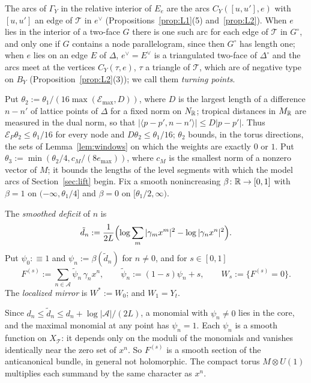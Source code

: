The arcs of $\Gamma_Y$ in the relative interior of $E_e$ are the arcs $C_Y([u,u'],e)$ with $[u,u']$ an edge of
$\mathcal T$ in $e^\vee$ (Propositions~\ref{prop:L1}(5) and~\ref{prop:L2}). When $e$ lies in the interior of a two-face
$G$ there is one such arc for each edge of $\mathcal T$ in $G^\circ$, and only one if $G$ contains a node parallelogram,
since then $G^\circ$ has length one; when $e$ lies on an edge $E$ of $\Delta$, $e^\vee=E^\vee$ is a triangulated two-face
of $\Delta^\circ$ and the arcs meet at the vertices $C_Y(\tau,e)$, $\tau$ a triangle of $\mathcal T$, which are of
negative type on $B_Y$ (Proposition~\ref{prop:L2}(3)); we call them \emph{turning points}.

Put $\theta_2:=\theta_1/(16\max(\mathcal E_{\max},D))$, where $D$ is the largest length of a difference $n-n'$ of lattice
points of $\Delta$ for a fixed norm on $N_\mathbb R$; tropical distances in $M_\mathbb R$ are measured in the dual norm, so that
$|\langle p-p',n-n'\rangle|\le D|p-p'|$. Thus $\mathcal E_P\theta_2\le\theta_1/16$ for every node and
$D\theta_2\le\theta_1/16$; $\theta_2$ bounds, in the torus directions, the sets of Lemma~\ref{lem:windows} on which the
weights are exactly $0$ or $1$. Put $\theta_3:=\min(\theta_2/4,c_M/(8e_{\max}))$, where $c_M$ is the smallest norm of a
nonzero vector of $M$; it bounds the lengths of the level segments with which the model arcs of
Section~\ref{sec:lift} begin. Fix a smooth nonincreasing $\beta\colon\mathbb R\to[0,1]$ with $\beta=1$ on
$(-\infty,\theta_1/4]$ and $\beta=0$ on $[\theta_1/2,\infty)$.

\begin{definition}\label{def:Ws}
The \emph{smoothed deficit} of $n$ is
\[
\tilde d_n:=\frac1{2L}\Bigl(\log\sum_m|\gamma_mx^m|^2-\log|\gamma_nx^n|^2\Bigr).
\]
Put $\psi_0:\equiv1$ and
$\psi_n:=\beta(\tilde d_n)$ for $n\neq0$, and for $s\in[0,1]$
\[
F^{(s)}:=\sum_{n\in\mathcal A}\tilde\psi_n\,\gamma_nx^n,\qquad \tilde\psi_n:=(1-s)\psi_n+s,\qquad W_s:=\{F^{(s)}=0\}.
\]
The \emph{localized mirror} is $W^*:=W_0$; and $W_1=Y_t$.
\end{definition}

Since $d_n\le\tilde d_n\le d_n+\log|\mathcal A|/(2L)$, a monomial with $\psi_n\ne0$ lies in the core, and the maximal
monomial at any point has $\psi_n=1$. Each $\psi_n$ is a smooth function on $X_{\mathcal T}$: it depends only on the
moduli of the monomials and vanishes identically near the zero set of $x^n$. So $F^{(s)}$ is a smooth section of the
anticanonical bundle, in general not holomorphic. The compact torus $M\otimes U(1)$ multiplies each summand by the
same character as $x^n$.

